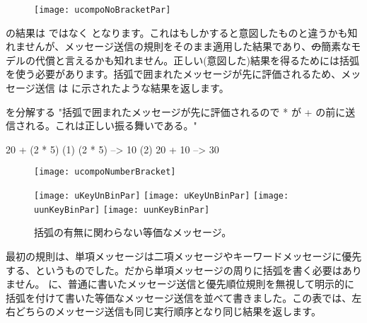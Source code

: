 \documentclass[a4paper,10pt,twoside]{book}
\begin{document}
\begin{figure}
\begin{center}\texttt{[image: ucompoNoBracketPar]}\end{center}
\end{figure}
\noindent
{}の結果は  ではなく  となります。これはもしかすると意図したものと違うかも知れませんが、メッセージ送信の規則をそのまま適用した結果であり、\st の簡素なモデルの代償と言えるかも知れません。正しい(意図した)結果を得るためには括弧を使う必要があります。括弧で囲まれたメッセージが先に評価されるため、メッセージ送信  は  に示されたような結果を返します。

\begin{example}[mathcorrect]{ を分解する}{}
"括弧で囲まれたメッセージが先に評価されるので * が + の前に送信される。これは正しい振る舞いである。"

    20 + (2 * 5)
(1)        (2 * 5) --> 10
(2) 20 + 10      --> 30
\end{example}

\begin{figure}
\begin{center}
\texttt{[image: ucompoNumberBracket]}
\end{center}
\end{figure}



\begin{figure}
\begin{center}
\ifluluelse
	{\texttt{[image: uKeyUnBinPar]}}
	{\texttt{[image: uKeyUnBinPar]}}
\ifluluelse
	{\texttt{[image: uunKeyBinPar]}}
	{\texttt{[image: uunKeyBinPar]}}
\end{center}
\caption{括弧の有無に関わらない等価なメッセージ。}
\end{figure}

最初の規則は、単項メッセージは二項メッセージやキーワードメッセージに優先する、というものでした。だから単項メッセージの周りに括弧を書く必要はありません。 に、普通に書いたメッセージ送信と優先順位規則を無視して明示的に括弧を付けて書いた等価なメッセージ送信を並べて書きました。この表では、左右どちらのメッセージ送信も同じ実行順序となり同じ結果を返します。
\end{document}
